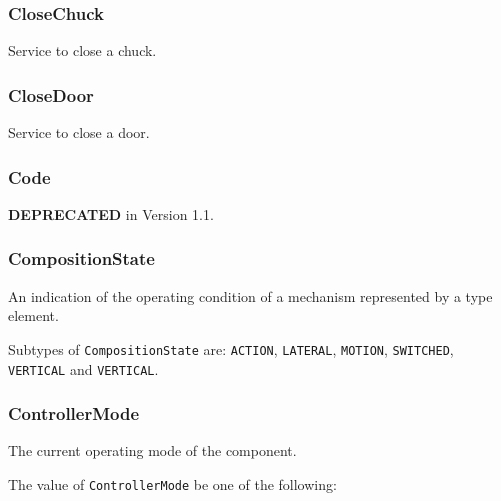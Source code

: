 \subsubsection{CloseChuck}
  \label{sec:CloseChuck}



Service to close a chuck.

\FloatBarrier

\subsubsection{CloseDoor}
  \label{sec:CloseDoor}



Service to close a door.

\FloatBarrier

\subsubsection{Code}
  \label{sec:Code}



\textbf{DEPRECATED} in Version 1.1.

\FloatBarrier

\subsubsection{CompositionState}
  \label{sec:CompositionState}



An indication of the operating condition of a mechanism represented by a  type element.


Subtypes of \texttt{CompositionState} are: \texttt{ACTION}, \texttt{LATERAL}, \texttt{MOTION}, \texttt{SWITCHED}, \texttt{VERTICAL} and \texttt{VERTICAL}. 
\FloatBarrier

\subsubsection{ControllerMode}
  \label{sec:ControllerMode}



The current operating mode of the  component.


The value of \texttt{ControllerMode} \MUST be one of the following: 

